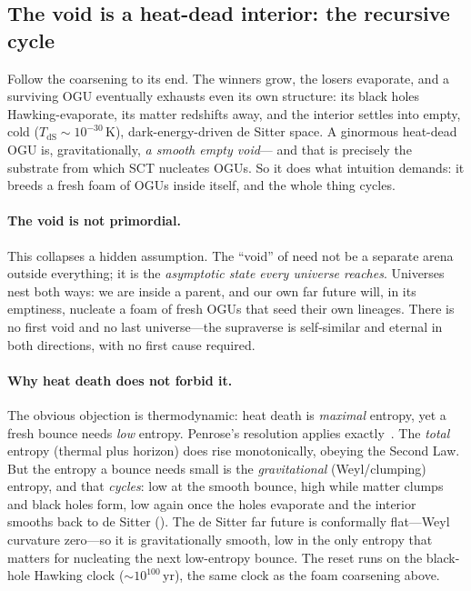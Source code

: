 \subsection{The void is a heat-dead interior: the recursive cycle}
\label{sec:recursive-cycle}

Follow the coarsening to its end. The winners grow, the losers evaporate, and a
surviving OGU eventually exhausts even its own structure: its black holes
Hawking-evaporate, its matter redshifts away, and the interior settles into empty,
cold ($T_{\mathrm{dS}}\sim10^{-30}\,\mathrm{K}$), dark-energy-driven de Sitter
space. A ginormous heat-dead OGU is, gravitationally, \emph{a smooth empty void}---
and that is precisely the substrate from which SCT nucleates OGUs. So it does what
intuition demands: it breeds a fresh foam of OGUs inside itself, and the whole
thing cycles.

\paragraph{The void is not primordial.} This collapses a hidden assumption. The
``void'' of  need not be a separate arena outside everything;
it is the \emph{asymptotic state every universe reaches}. Universes nest both ways:
we are inside a parent, and our own far future will, in its emptiness, nucleate a
foam of fresh OGUs that seed their own lineages. There is no first void and no last
universe---the supraverse is self-similar and eternal in both directions, with no
first cause required.

\paragraph{Why heat death does not forbid it.} The obvious objection is
thermodynamic: heat death is \emph{maximal} entropy, yet a fresh bounce needs
\emph{low} entropy. Penrose's resolution applies exactly~\citep{penrose2010}. The
\emph{total} entropy (thermal plus horizon) does rise monotonically, obeying the
Second Law. But the entropy a bounce needs small is the \emph{gravitational}
(Weyl/clumping) entropy, and that \emph{cycles}: low at the smooth bounce, high while
matter clumps and black holes form, low again once the holes evaporate and the
interior smooths back to de Sitter (). The de Sitter far future is
conformally flat---Weyl curvature zero---so it is gravitationally smooth, low in the
only entropy that matters for nucleating the next low-entropy bounce. The reset runs
on the black-hole Hawking clock ($\sim10^{100}\,\mathrm{yr}$), the same clock as the
foam coarsening above.

